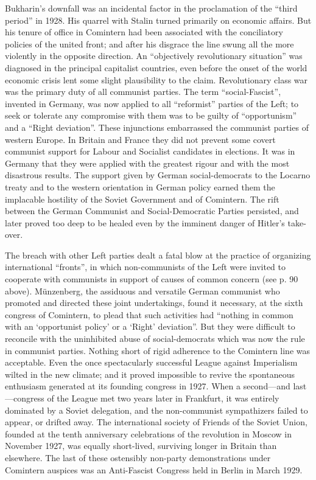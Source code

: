 Bukharin's downfall was an incidental factor in the proclamation of the ``third period'' in 1928. His quarrel with Stalin turned primarily on economic affairs. But his tenure of office in Comintern had been associated with the conciliatory policies of the united front; and after his disgrace the line swung all the more violently in the opposite direction. An ``objectively revolutionary situation'' was diagnosed in the principal capitalist countries, even before the onset of the world economic crisis lent some slight plausibility to the claim. Revolutionary class war was the primary duty of all communist parties. The term ``social-Fascist'', invented in Germany, was now applied to all ``reformist'' parties of the Left; to seek or tolerate any compromise with them was to be guilty of ``opportunism'' and a ``Right deviation''. These injunctions embarrassed the communist parties of western Europe. In Britain and France they did not prevent some covert communist support for Labour and Socialist candidates in elections. It was in Germany that they were applied with the greatest rigour and with the most disastrous results. The support given by German social-democrats to the Locarno treaty and to the western orientation in German policy earned them the implacable hostility of the Soviet Government and of Comintern. The rift between the German Communist and Social-Democratic Parties persisted, and later proved too deep to be healed even by the imminent danger of Hitler's take-over. 

The breach with other Left parties dealt a fatal blow at the practice of organizing international ``fronts'', in which non-communists of the Left were invited to cooperate with communists in support of causes of common concern (see p. 90 above). Münzenberg, the assiduous and versatile German communist who promoted and directed these joint undertakings, found it necessary, at the sixth congress of Comintern, to plead that such activities had ``nothing in common with an `opportunist policy' or a `Right' deviation''. But they were difficult to reconcile with the uninhibited abuse of social-democrats which was now the rule in communist parties. Nothing short of rigid adherence to the Comintern line was acceptable. Even the once spectacularly successful League against Imperialism wilted in the new climate; and it proved impossible to revive the spontaneous enthusiasm generated at its founding congress in 1927. When a second---and last---congress of the League met two years later in Frankfurt, it was entirely dominated by a Soviet delegation, and the non-communist sympathizers failed to appear, or drifted away. The international society of Friends of the Soviet Union, founded at the tenth anniversary celebrations of the revolution in Moscow in November 1927, was equally short-lived, surviving longer in Britain than elsewhere. The last of these ostensibly non-party demonstrations under Comintern auspices was an Anti-Fascist Congress held in Berlin in March 1929. 

